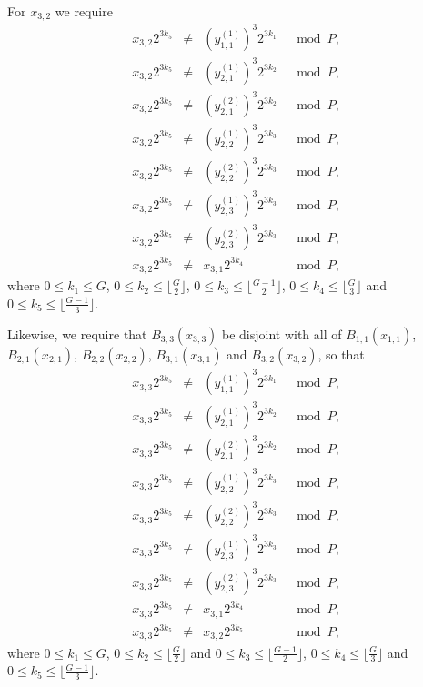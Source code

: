 For $x_{3,2}$ we require
\begin{equation}\label{eqx32}\begin{array}{cccc}
x_{3,2}2^{3k_5} &\neq& (y_{1,1}^{(1)})^3 2^{3k_1} &\mod P, \\
x_{3,2}2^{3k_5} &\neq& (y_{2,1}^{(1)})^3 2^{3k_2} &\mod P, \\
x_{3,2}2^{3k_5} &\neq& (y_{2,1}^{(2)})^3 2^{3k_2} &\mod P, \\
x_{3,2}2^{3k_5} &\neq& (y_{2,2}^{(1)})^3 2^{3k_3} &\mod P, \\
x_{3,2}2^{3k_5} &\neq& (y_{2,2}^{(2)})^3 2^{3k_3} &\mod P, \\
x_{3,2}2^{3k_5} &\neq& (y_{2,3}^{(1)})^3 2^{3k_3} &\mod P, \\
x_{3,2}2^{3k_5} &\neq& (y_{2,3}^{(2)})^3 2^{3k_3} &\mod P, \\
x_{3,2}2^{3k_5} &\neq& x_{3,1} 2^{3k_4} &\mod P,
\end{array}\end{equation}
where $0 \leq k_1 \leq G$, $0 \leq k_2 \leq \lfloor \frac{G}{2}
\rfloor$, $0 \leq k_3 \leq \lfloor\frac{G-1}{2} \rfloor$, $0 \leq
k_4 \leq \lfloor\frac{G}{3} \rfloor$ and $0 \leq k_5 \leq
\lfloor\frac{G-1}{3} \rfloor$.

Likewise, we require that $B_{3,3}(x_{3,3})$ be disjoint with all
of  $B_{1,1}(x_{1,1})$, $B_{2,1}(x_{2,1})$, $B_{2,2}(x_{2,2})$,
$B_{3,1}(x_{3,1})$ and $B_{3,2}(x_{3,2})$, so that
\begin{equation}\label{eqx33}\begin{array}{cccc}
x_{3,3}2^{3k_5} &\neq& (y_{1,1}^{(1)})^3 2^{3k_1} &\mod P, \\
x_{3,3}2^{3k_5} &\neq& (y_{2,1}^{(1)})^3 2^{3k_2} &\mod P, \\
x_{3,3}2^{3k_5} &\neq& (y_{2,1}^{(2)})^3 2^{3k_2} &\mod P, \\
x_{3,3}2^{3k_5} &\neq& (y_{2,2}^{(1)})^3 2^{3k_3} &\mod P, \\
x_{3,3}2^{3k_5} &\neq& (y_{2,2}^{(2)})^3 2^{3k_3} &\mod P, \\
x_{3,3}2^{3k_5} &\neq& (y_{2,3}^{(1)})^3 2^{3k_3} &\mod P, \\
x_{3,3}2^{3k_5} &\neq& (y_{2,3}^{(2)})^3 2^{3k_3} &\mod P, \\
x_{3,3}2^{3k_5} &\neq& x_{3,1} 2^{3k_4} &\mod P, \\
x_{3,3}2^{3k_5} &\neq& x_{3,2} 2^{3k_5} &\mod P,
\end{array}\end{equation}
where $0 \leq k_1 \leq G$, $0 \leq k_2 \leq \lfloor \frac{G}{2}
\rfloor$ and $0 \leq k_3 \leq \lfloor\frac{G-1}{2} \rfloor$, $0
\leq k_4 \leq \lfloor\frac{G}{3} \rfloor$ and $0 \leq k_5 \leq
\lfloor\frac{G-1}{3} \rfloor$.

